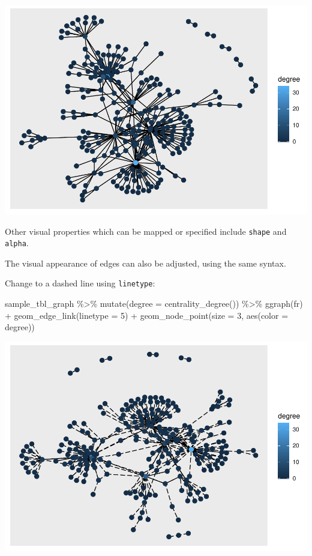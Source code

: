 \documentclass[
]{book}
\newenvironment{Shaded}{\begin{snugshade}}{\end{snugshade}}
\newcommand{\AttributeTok}[1]{\textcolor[rgb]{0.77,0.63,0.00}{#1}}
\newcommand{\DecValTok}[1]{\textcolor[rgb]{0.00,0.00,0.81}{#1}}
\newcommand{\FunctionTok}[1]{\textcolor[rgb]{0.00,0.00,0.00}{#1}}
\newcommand{\NormalTok}[1]{#1}
\newcommand{\SpecialCharTok}[1]{\textcolor[rgb]{0.00,0.00,0.00}{#1}}
\newcommand{\StringTok}[1]{\textcolor[rgb]{0.31,0.60,0.02}{#1}}
\begin{document}
\includegraphics{_main_files/figure-latex/unnamed-chunk-61-1.pdf}

Other visual properties which can be mapped or specified include \texttt{shape} and \texttt{alpha}.

The visual appearance of edges can also be adjusted, using the same syntax.

Change to a dashed line using \texttt{linetype}:

\begin{Shaded}
\begin{Highlighting}[]
\NormalTok{sample\_tbl\_graph }\SpecialCharTok{\%\textgreater{}\%} 
  \FunctionTok{mutate}\NormalTok{(}\AttributeTok{degree =} \FunctionTok{centrality\_degree}\NormalTok{()) }\SpecialCharTok{\%\textgreater{}\%} 
  \FunctionTok{ggraph}\NormalTok{(}\StringTok{\textquotesingle{}fr\textquotesingle{}}\NormalTok{) }\SpecialCharTok{+} 
  \FunctionTok{geom\_edge\_link}\NormalTok{(}\AttributeTok{linetype =} \DecValTok{5}\NormalTok{) }\SpecialCharTok{+} 
  \FunctionTok{geom\_node\_point}\NormalTok{(}\AttributeTok{size =} \DecValTok{3}\NormalTok{, }\FunctionTok{aes}\NormalTok{(}\AttributeTok{color =}\NormalTok{ degree))}
\end{Highlighting}
\end{Shaded}

\includegraphics{_main_files/figure-latex/unnamed-chunk-62-1.pdf}
\end{document}
